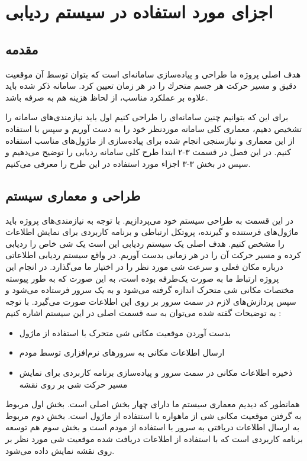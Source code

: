 \chapter{اجزای مورد استفاده در سیستم ردیابی}

\section{مقدمه}
هدف اصلی پروژه ما طراحی و پياده‌سازی سامانه‌ای است كه بتوان توسط آن موقعيت دقيق و مسير حركت هر جسم متحرك را در هر زمان تعيين كرد. سامانه ذکر شده باید علاوه بر عملکرد مناسب، از لحاظ هزینه هم به صرفه باشد.


برای این که بتوانیم چنین سامانه‌ای را طراحی کنیم اول باید نیازمندی‌های سامانه را تشخیص دهیم، معماری کلی سامانه موردنظر خود را به دست آوریم و سپس با استفاده از این معماری و نیازسنجی انجام شده برای پیاده‌سازی از ماژول‌های مناسب استفاده کنیم. در این فصل در قسمت ۳-۲ ابتدا طرح کلی سامانه ردیابی را توضیح می‌دهیم و سپس در بخش ۳-۳ اجزاء مورد استفاده در این طرح را معرفی می‌کنیم.
\section{طراحی و معماری سیستم}
در این قسمت به طراحی سیستم خود می‌پردازیم. با توجه به نیازمندی‌های پروژه باید ماژول‌های فرستنده و گیرنده، پروتکل ارتباطی و برنامه کاربردی برای نمایش اطلاعات را مشخص کنیم.
هدف اصلی یک سیستم ردیابی این است یک شی خاص را ردیابی کرده و مسیر حرکت آن را در هر زمانی بدست آوریم. در واقع سیستم ردیابی اطلاعاتی درباره مکان فعلی و سرعت شی مورد نظر را در اختیار ما می‌گذارد. در انجام این پروژه ارتباط ما به صورت یک‌طرفه بوده است، به این صورت که به طور پیوسته مختصات مکانی شی متحرک اندازه گرفته می‌شود و به یک سرور فرستاده می‌شود و سپس پردازش‌های لازم در سمت سرور بر روی این اطلاعات صورت می‌گیرد. با توجه به توضیحات گفته شده می‌توان به سه قسمت اصلی در این سیستم اشاره کنیم \cite{bidabad}:
\begin{itemize}
	\item
بدست آوردن موقعیت مکانی شی متحرک با استفاده از ماژول 
	\item
	ارسال اطلاعات مکانی به سرورهای نرم‌افزاری توسط مودم 
	\item
	ذخیره اطلاعات مکانی در سمت سرور و پیاده‌سازی برنامه کاربردی برای نمایش مسیر حرکت شی بر روی نقشه
\end{itemize} 
همانطور که دیدیم معماری سیستم ما دارای چهار بخش اصلی است. بخش اول مربوط به گرفتن موقعیت مکانی شی از ماهواره با استتفاده از ماژول  است. بخش دوم مربوط به ارسال اطلاعات دریافتی به سرور با استفاده از مودم  است و بخش سوم هم توسعه برنامه کاربردی است که با استفاده از اطلاعات دریافت شده موقعیت شی مورد نظر بر روی نقشه نمایش داده می‌شود.

